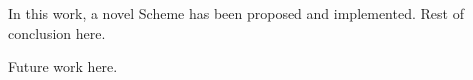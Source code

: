 In this work, a novel Scheme has been proposed and implemented. Rest of conclusion here. \par
Future work here.
